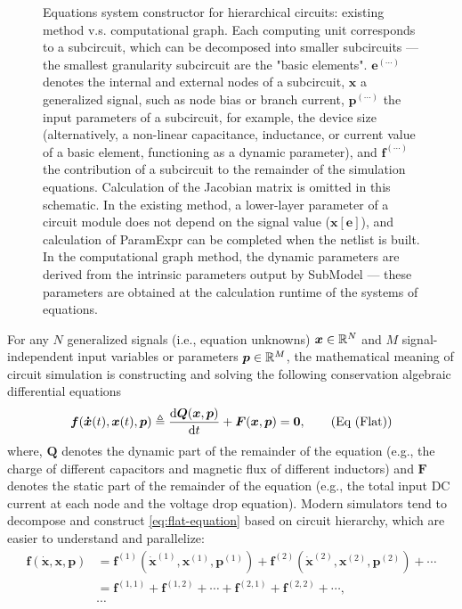 \begin{figure}[htpb]
	\caption{Equations system constructor for hierarchical circuits: existing method v.s. computational graph. Each computing unit corresponds to a subcircuit, which can be decomposed into smaller subcircuits --- the smallest granularity subcircuit are the "basic elements". $\bm{e}^{(\cdots)}$ denotes the internal and external nodes of a subcircuit, $\bm{x}$ a generalized signal, such as node bias or branch current, $\bm{p}^{(\cdots)}$ the input parameters of a subcircuit, for example, the device size (alternatively, a non-linear capacitance, inductance, or current value of a basic element, functioning as a dynamic parameter), and $\bm{f}^{(\cdots)}$ the contribution of a subcircuit to the remainder of the simulation equations. Calculation of the Jacobian matrix is omitted in this schematic. In the existing method, a lower-layer parameter of a circuit module does not depend on the signal value ($\bm{x}[\bm{e}]$), and calculation of ParamExpr can be completed when the netlist is built. In the computational graph method, the dynamic parameters are derived from the {\color{capri}intrinsic parameters} output by SubModel --- these parameters are obtained at the calculation runtime of the systems of equations.}
	\label{fig:equations-system-constructor}
\end{figure}
For any $N$ generalized signals (i.e., equation unknowns) $\bm{x}\in\mathbb{R}^N$ and $M$ signal-independent input variables or parameters $\bm{p}\in\mathbb{R}^M$, the mathematical meaning of circuit simulation is constructing and solving the following conservation algebraic differential equations \cite{najm2010circuit,gunther2005modelling,hu2020adjoint}
\begin{equation}\label{eq:flat-equation}
\bm{f}(\bm{\dot{x}}(t), \bm{x}(t), \bm{p})
\triangleq\frac{\mathrm{d}\bm{Q}(\bm{x},\bm{p})}{\mathrm{d} t}+\bm{F}(\bm{x},\bm{p})
=\bm{0},\tag{Eq (Flat)}
\end{equation}
where, $\bm{Q}$ denotes the dynamic part of the remainder of the equation (e.g., the charge of different capacitors and magnetic flux of different inductors) and $\bm{F}$ denotes the static part of the remainder of the equation (e.g., the total input DC current at each node and the voltage drop equation). Modern simulators tend to decompose and construct \ref{eq:flat-equation} based on circuit hierarchy, which are easier to understand and parallelize:
\begin{equation}\label{eq:hierarchical-equation}
\begin{split}
\bm{f}(\bm{\dot{x}},\bm{x},\bm{p})
& = \bm{f}^{(1)}(\bm{\dot{x}}^{(1)},\bm{x}^{(1)},\bm{p}^{(1)})
+ \bm{f}^{(2)}(\bm{\dot{x}}^{(2)},\bm{x}^{(2)},\bm{p}^{(2)})
+ \cdots \\
& = \bm{f}^{(1,1)}+\bm{f}^{(1,2)}+\cdots+\bm{f}^{(2,1)}+\bm{f}^{(2,2)}+\cdots, \\
& \cdots
\end{split}\tag{Eq (Hierarchical)}
\end{equation}
